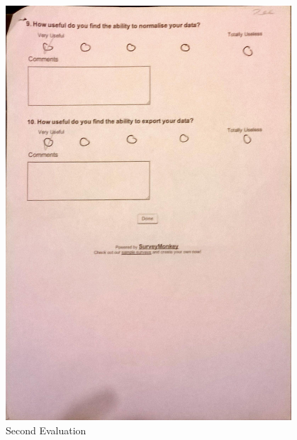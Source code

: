 \begin{figure}[h!]
    \centering
    \includegraphics[width=0.95\textwidth]{images/user_eval/user_eval_11.jpg}
    \caption{Second Evaluation}
\end{figure}

